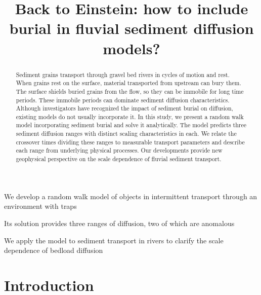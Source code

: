 \documentclass[draft,grl]{agujournal2018}
\begin{document}
\title{Back to Einstein: how to include burial in fluvial sediment diffusion models?}


\begin{keypoints}
\item We develop a random walk model of objects in intermittent transport through an environment with traps
\item Its solution provides three ranges of diffusion, two of which are anomalous
\item We apply the model to sediment transport in rivers to clarify the scale dependence of bedload diffusion

\end{keypoints}

\begin{abstract}
Sediment grains transport through gravel bed rivers in cycles of motion and rest.
When grains rest on the surface, material transported from upstream can bury them.
The surface shields buried grains from the flow, so they can be immobile for long time periods.
These immobile periods can dominate sediment diffusion characteristics.
Although investigators have recognized the impact of sediment burial on diffusion, existing models do not usually incorporate it.
In this study, we present a random walk model incorporating sediment burial and solve it analytically.
The model predicts three sediment diffusion ranges with distinct scaling characteristics in each.
We relate the crossover times dividing these ranges to measurable transport parameters and describe each range from underlying physical processes.
Our developments provide new geophysical perspective on the scale dependence of fluvial sediment transport.
\end{abstract}

\section{Introduction}
\end{document}

